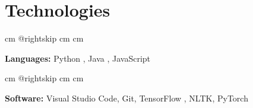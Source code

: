\documentclass[10pt, letterpaper]{article}
\begin{document}
    
    \section{Technologies}

        \begingroup{} cm
        \advance\csname @rightskip cm
        \advance{} cm

        \textbf{Languages:}  Python , Java ,  JavaScript   \par\endgroup

        \vspace{0.2 cm}
        \begingroup{} cm
        \advance\csname @rightskip cm
        \advance{} cm

        \textbf{Software:} Visual Studio Code, Git, TensorFlow , NLTK, PyTorch \par\endgroup


    
\end{document}
